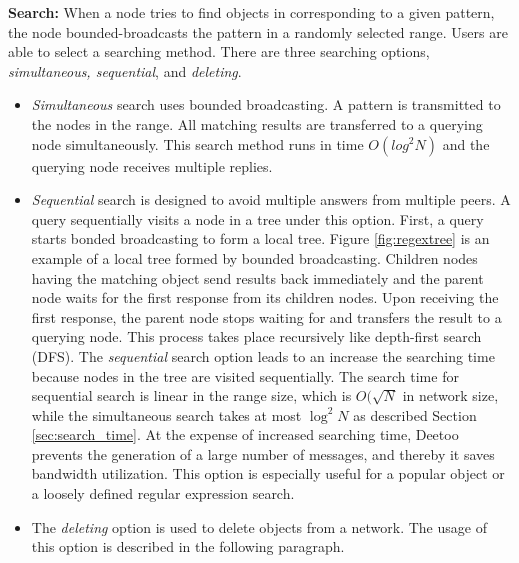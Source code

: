 \documentclass[conference]{IEEEtran}
\begin{document}
\textbf{Search:}
When a node tries to find objects in corresponding to a given pattern, the node bounded-broadcasts 
the pattern in a randomly selected range. 
Users are able to select a searching method. There are three searching options, 
\textit{simultaneous, sequential}, and \textit{deleting}.
\begin{itemize}
\item \textit{Simultaneous} search uses bounded broadcasting. A pattern is transmitted 
to the nodes in the range. All matching results are transferred to a querying 
node simultaneously. This search method runs in time $O(log^2 N)$ and the querying node 
receives multiple replies.
\item \textit{Sequential} search is designed to avoid multiple answers from multiple peers.
A query sequentially visits a node in a tree under this option. 
First, a query starts bonded broadcasting to form a local tree. 
Figure \ref{fig:regextree} is an example of a local tree formed by bounded broadcasting. 
Children nodes having the matching object send results back immediately and the 
parent node waits for the first response from its children nodes. Upon receiving 
the first response, the parent node stops waiting for and transfers the result to a querying 
node. This process takes place recursively like depth-first search (DFS). 
The \textit{sequential} search option leads to an increase the searching time because nodes in the
tree are visited sequentially. The search time for sequential search is linear
in the range size, which is $O(\sqrt{N}$ in network size, while 
the simultaneous search takes at most $\log^2 N$ as described Section \ref{sec:search_time}.
At the expense of increased searching time, Deetoo prevents the generation of a large number of 
messages, and thereby it saves bandwidth utilization.
This option is especially useful for a popular object or a loosely defined regular expression search.
\item The \textit{deleting} option is used to delete objects from a network. 
The usage of this option is described in the following paragraph.
\end{itemize}
\end{document}
